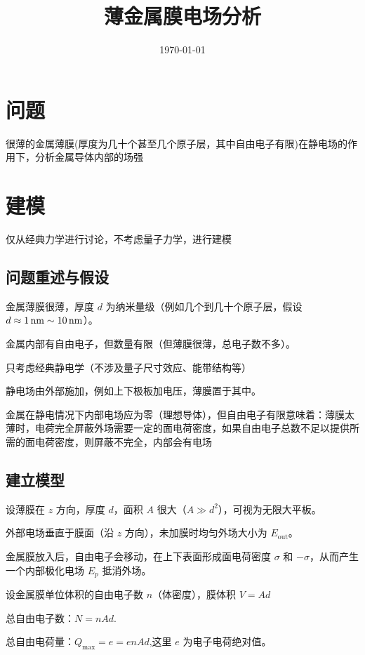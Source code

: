 \documentclass{article}
\title{薄金属膜电场分析}
\date{\today}
\author{}
\begin{document}
\maketitle

\section{问题}

很薄的金属薄膜(厚度为几十个甚至几个原子层，其中自由电子有限)在静电场的作用下，分析金属导体内部的场强

\section{建模}
仅从经典力学进行讨论，不考虑量子力学，进行建模

\subsection{问题重述与假设}

金属薄膜很薄，厚度 $ d $ 为纳米量级（例如几个到几十个原子层，假设 $ d \approx 1 \,\rm{nm} \sim 10 \,\rm{nm} $）。

金属内部有自由电子，但数量有限（但薄膜很薄，总电子数不多）。

只考虑经典静电学（不涉及量子尺寸效应、能带结构等）

静电场由外部施加，例如上下极板加电压，薄膜置于其中。

金属在静电情况下内部电场应为零（理想导体），但自由电子有限意味着：薄膜太薄时，电荷完全屏蔽外场需要一定的面电荷密度，如果自由电子总数不足以提供所需的面电荷密度，则屏蔽不完全，内部会有电场

\subsection{建立模型}

设薄膜在 $ z $ 方向，厚度 $ d $，面积 $ A $ 很大（$ A \gg d^2 $），可视为无限大平板。

外部电场垂直于膜面（沿 $ z $ 方向），未加膜时均匀外场大小为 $ E_\text{out} $。

金属膜放入后，自由电子会移动，在上下表面形成面电荷密度 $ \sigma $ 和 $ -\sigma $，从而产生一个内部极化电场 $ E_p $ 抵消外场。


设金属膜单位体积的自由电子数 $ n $（体密度），膜体积 $ V = A d $

总自由电子数：$N = n A d.$

总自由电荷量：$Q_\text{max} = e  = e n A d$,这里 $ e $ 为电子电荷绝对值。
\end{document}
